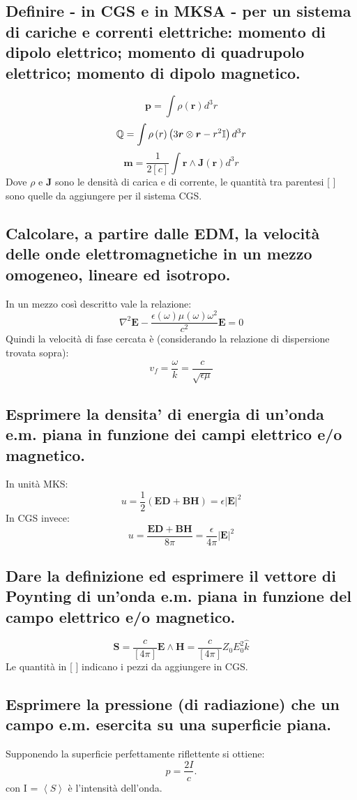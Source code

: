 \subsection[]{ Definire - in CGS e in MKSA - per un sistema di cariche e correnti elettriche: momento di dipolo elettrico; momento di quadrupolo elettrico;  momento di dipolo magnetico.}
\[
	\boldsymbol{p} = \int \rho \left( \boldsymbol{r} \right) d^{3}r     
\] 
\[
	\mathbb{Q} = \int \rho \left( r \right) \left( 3 \boldsymbol{r} \otimes \boldsymbol{r} -  r^2 \mathbb{I}  \right) d^3 r 
\] 
\[
	\boldsymbol{m} = \frac{1}{2[c]}\int \boldsymbol{r} \wedge \boldsymbol{J}\left(\boldsymbol{r}\right) d^3r
\] 
Dove $\rho$ e  $\boldsymbol{J}$ sono le densità di carica e di corrente, le quantità tra parentesi [ ] sono quelle da aggiungere per il sistema CGS.

\subsection[]{ Calcolare, a partire dalle EDM, la velocità delle onde elettromagnetiche in un mezzo omogeneo, lineare ed isotropo.}
In un mezzo così descritto vale la relazione:
\[
	\nabla^{2}\boldsymbol{E} - \frac{\epsilon\left( \omega \right) \mu \left( \omega \right) \omega^{2}}{c^{2}}\boldsymbol{E} = 0 
\] 
Quindi la velocità di fase cercata è (considerando la relazione di dispersione trovata sopra):
\[
v_{f} = \frac{\omega}{k} =  \frac{c}{\sqrt{\epsilon \mu} }
\] 
\subsection[]{ Esprimere la densita’ di energia di un’onda e.m. piana in funzione dei campi elettrico e/o magnetico.}
In unità MKS:
\[
	u = \frac{1}{2} \left( \boldsymbol{E}\boldsymbol{D} + \boldsymbol{B}\boldsymbol{H} \right) = \epsilon |\boldsymbol{E}|^2    
\] 
In CGS invece:
\[
	u = \frac{\boldsymbol{E}\boldsymbol{D} + \boldsymbol{B}\boldsymbol{H}}{8\pi} = \frac{\epsilon}{4\pi} |\boldsymbol{E}|^2 
\]
\subsection[]{ Dare la definizione ed esprimere il vettore di Poynting di un’onda e.m. piana in funzione del campo elettrico e/o magnetico.}
\[
	\boldsymbol{S} = \frac{c}{[4\pi]}\boldsymbol{E} \wedge \boldsymbol{H} = \frac{c}{[4\pi]}Z_{0} E_0^2 \hat{k}     
\] 
Le quantità in [ ] indicano i pezzi da aggiungere in CGS.

\subsection[]{ Esprimere la pressione (di radiazione) che un campo e.m. esercita su una superficie piana.}
Supponendo la superficie perfettamente riflettente si ottiene:
\[
	p = \frac{2I}{c} 
.\] 
con I = $\left<S\right>$ è l'intensità dell'onda. 
